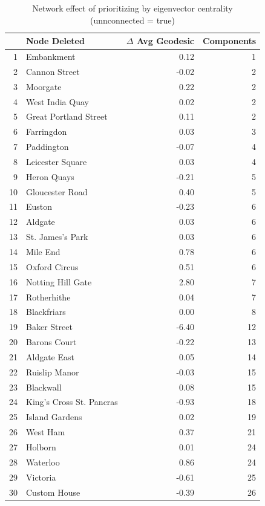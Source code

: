\documentclass[11pt]{article} %
\begin{document}

\begin{table}[htbp]
\centering
\begin{tabular}{|r|l|r|r|}
\hline
\multicolumn{1}{|l|}{} & Node Deleted & \multicolumn{1}{l|}{$\Delta$ Avg Geodesic} & \multicolumn{1}{l|}{Components} \\ \hline
1 & Embankment & 0.12 & 1 \\ 
2 & Cannon Street & -0.02 & 2 \\ 
3 & Moorgate & 0.22 & 2 \\ 
4 & West India Quay & 0.02 & 2 \\ 
5 & Great Portland Street & 0.11 & 2 \\ 
6 & Farringdon & 0.03 & 3 \\ 
7 & Paddington & -0.07 & 4 \\ 
8 & Leicester Square & 0.03 & 4 \\ 
9 & Heron Quays & -0.21 & 5 \\ 
10 & Gloucester Road & 0.40 & 5 \\ 
11 & Euston & -0.23 & 6 \\ 
12 & Aldgate & 0.03 & 6 \\ 
13 & St. James's Park & 0.03 & 6 \\ 
14 & Mile End & 0.78 & 6 \\ 
15 & Oxford Circus & 0.51 & 6 \\ 
16 & Notting Hill Gate & 2.80 & 7 \\ 
17 & Rotherhithe & 0.04 & 7 \\ 
18 & Blackfriars & 0.00 & 8 \\ 
19 & Baker Street & -6.40 & 12 \\ 
20 & Barons Court & -0.22 & 13 \\ 
21 & Aldgate East & 0.05 & 14 \\ 
22 & Ruislip Manor & -0.03 & 15 \\ 
23 & Blackwall & 0.08 & 15 \\ 
24 & King's Cross St. Pancras & -0.93 & 18 \\ 
25 & Island Gardens & 0.02 & 19 \\ 
26 & West Ham & 0.37 & 21 \\ 
27 & Holborn & 0.01 & 24 \\ 
28 & Waterloo & 0.86 & 24 \\ 
29 & Victoria & -0.61 & 25 \\ 
30 & Custom House & -0.39 & 26 \\ \hline
\end{tabular}
\caption{Network effect of prioritizing  by eigenvector centrality \\ (unnconnected = true)}
\label{eig false}
\end{table}
\end{document}
